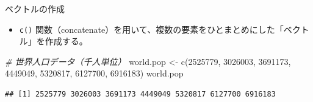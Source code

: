\documentclass[
  ignorenonframetext,
]{beamer}
\newenvironment{Shaded}{\begin{snugshade}}{\end{snugshade}}
\newcommand{\CommentTok}[1]{\textcolor[rgb]{0.56,0.35,0.01}{\textit{#1}}}
\newcommand{\DecValTok}[1]{\textcolor[rgb]{0.00,0.00,0.81}{#1}}
\newcommand{\FunctionTok}[1]{\textcolor[rgb]{0.00,0.00,0.00}{#1}}
\newcommand{\NormalTok}[1]{#1}
\newcommand{\OtherTok}[1]{\textcolor[rgb]{0.56,0.35,0.01}{#1}}
\providecommand{\tightlist}{%
  \setlength{\itemsep}{0pt}\setlength{\parskip}{0pt}}
\begin{document}
\begin{frame}[fragile]{ベクトルの作成}
\protect\hypertarget{ux30d9ux30afux30c8ux30ebux306eux4f5cux6210}{}
\begin{itemize}
\tightlist
\item
  \texttt{c()}
  関数（concatenate）を用いて、複数の要素をひとまとめにした「ベクトル」を作成する。
\end{itemize}

\begin{Shaded}
\begin{Highlighting}[]
\CommentTok{\# 世界人口データ（千人単位）}
\NormalTok{world.pop }\OtherTok{\textless{}{-}} \FunctionTok{c}\NormalTok{(}\DecValTok{2525779}\NormalTok{, }\DecValTok{3026003}\NormalTok{, }\DecValTok{3691173}\NormalTok{, }\DecValTok{4449049}\NormalTok{, }
               \DecValTok{5320817}\NormalTok{, }\DecValTok{6127700}\NormalTok{, }\DecValTok{6916183}\NormalTok{)}
\NormalTok{world.pop}
\end{Highlighting}
\end{Shaded}

\begin{verbatim}
## [1] 2525779 3026003 3691173 4449049 5320817 6127700 6916183
\end{verbatim}
\end{frame}
\end{document}
